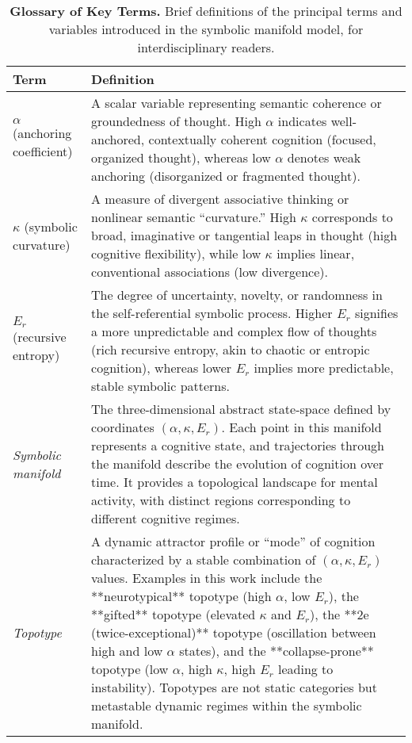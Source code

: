 \begin{table}[t]
\caption{\textbf{Glossary of Key Terms.} Brief definitions of the principal terms and variables introduced in the symbolic manifold model, for interdisciplinary readers.}
\label{tab:glossary}
\renewcommand{\arraystretch}{1.2}
\begin{tabular}{p{3.2cm} p{12cm}}
\textbf{Term} & \textbf{Definition} \\ \hline
$\alpha$ (anchoring coefficient) & A scalar variable representing semantic coherence or groundedness of thought. High $\alpha$ indicates well-anchored, contextually coherent cognition (focused, organized thought), whereas low $\alpha$ denotes weak anchoring (disorganized or fragmented thought). \\
$\kappa$ (symbolic curvature) & A measure of divergent associative thinking or nonlinear semantic “curvature.” High $\kappa$ corresponds to broad, imaginative or tangential leaps in thought (high cognitive flexibility), while low $\kappa$ implies linear, conventional associations (low divergence). \\
$E_r$ (recursive entropy) & The degree of uncertainty, novelty, or randomness in the self-referential symbolic process. Higher $E_r$ signifies a more unpredictable and complex flow of thoughts (rich recursive entropy, akin to chaotic or entropic cognition), whereas lower $E_r$ implies more predictable, stable symbolic patterns. \\
\textit{Symbolic manifold} & The three-dimensional abstract state-space defined by coordinates $(\alpha,\kappa,E_r)$. Each point in this manifold represents a cognitive state, and trajectories through the manifold describe the evolution of cognition over time. It provides a topological landscape for mental activity, with distinct regions corresponding to different cognitive regimes. \\
\textit{Topotype} & A dynamic attractor profile or “mode” of cognition characterized by a stable combination of $(\alpha,\kappa,E_r)$ values. Examples in this work include the **neurotypical** topotype (high $\alpha$, low $E_r$), the **gifted** topotype (elevated $\kappa$ and $E_r$), the **2e (twice-exceptional)** topotype (oscillation between high and low $\alpha$ states), and the **collapse-prone** topotype (low $\alpha$, high $\kappa$, high $E_r$ leading to instability). Topotypes are not static categories but metastable dynamic regimes within the symbolic manifold. \\ \hline
\end{tabular}
\end{table}
